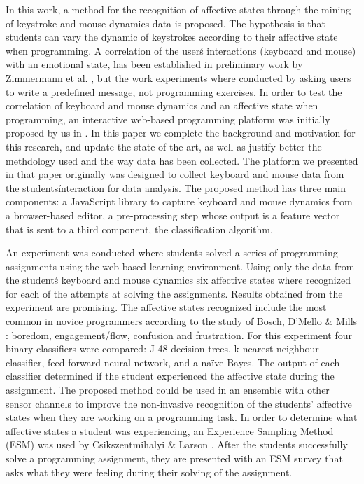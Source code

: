 \documentclass[a4paper,twoside]{article}
\begin{document}
In this work, a method for the recognition of affective states through the
mining of keystroke and mouse dynamics data is proposed.
The hypothesis is that students can vary the dynamic of keystrokes according
to their affective state when programming. A correlation of the
user\'s interactions (keyboard and mouse) with an emotional state, has been
established in preliminary work by Zimmermann
et al. \cite{zimmermann2003affective}, but the work experiments where
conducted by asking users to write a predefined message, not programming
exercises.
In order to test the correlation of keyboard and mouse dynamics and an
affective state when programming, an interactive web-based
programming platform was initially proposed by us in
\cite{ijcci17}. In this paper we complete the background and
motivation for this research, and update the state of the art, as well
as justify better the methdology used and the way data has been
collected. The platform we presented in that paper originally was
designed to collect keyboard and mouse data
from the students\' interaction for data analysis. The proposed method
has three main components: a JavaScript library to capture keyboard
and mouse dynamics from a browser-based editor, a pre-processing step
whose output is a feature vector that is sent to a third component,
the classification algorithm.

An experiment was conducted where students solved a series of programming
assignments using the web based learning environment. Using only the
data from the student\'s keyboard and mouse dynamics six affective
states where recognized for each of the attempts at solving the
assignments. Results obtained from the experiment are promising. The
affective states recognized include the most common in novice
programmers according to the study of Bosch, D'Mello \& Mills
\cite{bixler2013detecting}: boredom, engagement/flow, confusion and
frustration. For this experiment
four binary classifiers were compared: J-48 decision trees, k-nearest neighbour
classifier, feed forward neural network, and a na\"ive Bayes. The output of each
classifier determined if the student experienced the affective state during the
assignment.
The proposed method could be used in an ensemble with other sensor
channels to improve the non-invasive recognition of the students’ affective
states when they are working on a programming task.
In order to determine what
affective states a student was experiencing, an Experience Sampling Method (ESM)
was used by Csikszentmihalyi \& Larson \cite{kubey1996experience}. After the students successfully
solve a programming assignment, they are presented with an ESM survey that asks
what they were feeling during their solving of the assignment.
\end{document}
